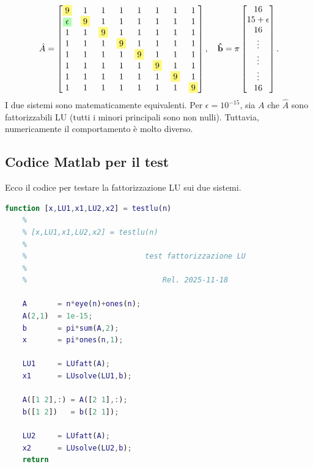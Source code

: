 \[
\hat{A} = 
\begin{bmatrix}
\colorbox{yellow!50}{9} & 1 & 1 & 1 & 1 & 1 & 1 & 1 \\
\colorbox{green!30}{$\epsilon$} & \colorbox{yellow!50}{9} & 1 & 1 & 1 & 1 & 1 & 1 \\
1 & 1 & \colorbox{yellow!50}{9} & 1 & 1 & 1 & 1 & 1 \\
1 & 1 & 1 & \colorbox{yellow!50}{9} & 1 & 1 & 1 & 1 \\
1 & 1 & 1 & 1 & \colorbox{yellow!50}{9} & 1 & 1 & 1 \\
1 & 1 & 1 & 1 & 1 & \colorbox{yellow!50}{9} & 1 & 1 \\
1 & 1 & 1 & 1 & 1 & 1 & \colorbox{yellow!50}{9} & 1 \\
1 & 1 & 1 & 1 & 1 & 1 & 1 & \colorbox{yellow!50}{9}
\end{bmatrix}
, \quad
\mathbf{\hat{b}} = \pi
\begin{bmatrix}
16 \\
15+\epsilon \\
16 \\
\vdots \\
\vdots \\
\vdots \\
16
\end{bmatrix}.
\]
I due sistemi sono matematicamente equivalenti. Per $\epsilon = 10^{-15}$, sia $A$ che $\hat{A}$ sono fattorizzabili LU (tutti i minori principali sono non nulli). Tuttavia, numericamente il comportamento è molto diverso.

\subsection{Codice Matlab per il test}
Ecco il codice per testare la fattorizzazione LU sui due sistemi.

\begin{lstlisting}[language=Matlab]
    function [x,LU1,x1,LU2,x2] = testlu(n)
    %
    % [x,LU1,x1,LU2,x2] = testlu(n)
    %
    %                           test fattorizzazione LU
    %
    %                               Rel. 2025-11-18
    
    A       = n*eye(n)+ones(n);
    A(2,1)  = 1e-15;
    b       = pi*sum(A,2);
    x       = pi*ones(n,1);
    
    LU1     = LUfatt(A);
    x1      = LUsolve(LU1,b);
    
    A([1 2],:) = A([2 1],:);
    b([1 2])   = b([2 1]);
    
    LU2     = LUfatt(A);
    x2      = LUsolve(LU2,b);
    return
    \end{lstlisting}
    
